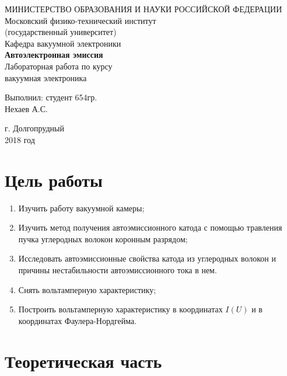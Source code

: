 \documentclass[a4paper, 12pt]{article}
\begin{document}
	\begin{titlepage}
		\begin{center}
		МИНИСТЕРСТВО ОБРАЗОВАНИЯ И НАУКИ РОССИЙСКОЙ ФЕДЕРАЦИИ\\
		\footnotesize{Московский физико-технический институт}\\
		\footnotesize{(государственный университет)}\\
		\footnotesize{Кафедра вакуумной электроники}\\
		\vfill
		{\LARGE
		\textbf{Автоэлектронная эмиссия}\\
		}
		\vspace{1cm}
		Лабораторная работа по курсу\\
		вакуумная электроника
		\vfill
		\begin{flushright}
			Выполнил: студент 654гр.\\
			Нехаев А.С.
		\end{flushright}
		\vfill
		г. Долгопрудный\\
		2018 год
		\end{center}
	\end{titlepage}
	\newpage
	\tableofcontents
	\newpage
	\section{Цель работы}
	\begin{enumerate}
		\item Изучить работу вакуумной камеры;
		\item Изучить метод получения автоэмиссионного катода с помощью травления пучка углеродных волокон коронным разрядом;
		\item Исследовать автоэмиссионные свойства катода из углеродных волокон и причины нестабильности автоэмиссионного тока в нем.
		\item Снять вольтамперную характеристику;
		\item Построить вольтамперную характеристику в координатах $I(U)$ и в координатах Фаулера-Нордгейма.
	\end{enumerate}
	\newpage
	\section{Теоретическая часть}
\end{document}
